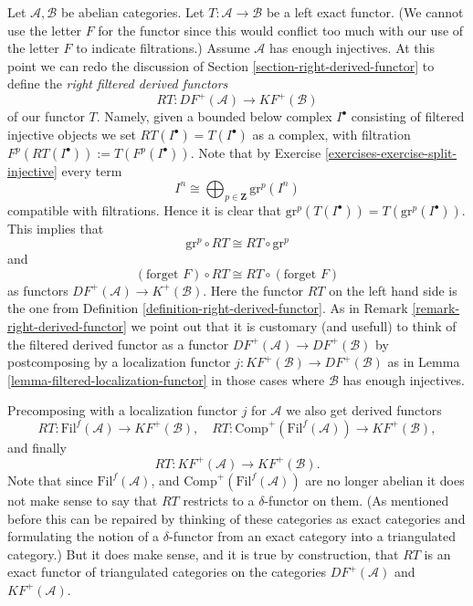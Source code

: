 \noindent
Let $\mathcal{A}, \mathcal{B}$ be abelian categories.
Let $T : \mathcal{A} \to \mathcal{B}$ be a left exact functor.
(We cannot use the letter $F$ for the functor since this would
conflict too much with our use of the letter $F$ to indicate
filtrations.)
Assume $\mathcal{A}$ has enough injectives.
At this point we can redo the discussion of 
Section \ref{section-right-derived-functor} to define the
{\it right filtered derived functors}
\begin{equation}
\label{equation-filtered-derived-functor}
RT : DF^{+}(\mathcal{A}) \longrightarrow KF^{+}(\mathcal{B})
\end{equation}
of our functor $T$. Namely, given a bounded below complex $I^\bullet$
consisting of filtered injective objects we set
$RT(I^\bullet) = T(I^\bullet)$ as a complex, with filtration
$F^p(RT(I^\bullet)) := T(F^p(I^\bullet))$. Note that by
Exercise \ref{exercises-exercise-split-injective} every term
\begin{equation}
\label{equation-decompose}
I^n \cong \bigoplus\nolimits_{p \in \mathbf{Z}} \text{gr}^p(I^n)
\end{equation}
compatible with filtrations. Hence it is clear that
$\text{gr}^p(T(I^\bullet)) = T(\text{gr}^p(I^\bullet))$.
This implies that
\begin{equation}
\label{equation-commute-gr}
\text{gr}^p \circ RT \cong RT \circ \text{gr}^p
\end{equation}
and
\begin{equation}
\label{equation-commute-forget}
(\text{forget }F) \circ RT \cong RT \circ (\text{forget }F)
\end{equation}
as functors $DF^{+}(\mathcal{A}) \to K^{+}(\mathcal{B})$.
Here the functor $RT$ on the left hand side is the one from
Definition \ref{definition-right-derived-functor}.
As in Remark \ref{remark-right-derived-functor} we point out that it
is customary (and usefull) to think of the filtered derived functor
as a functor $DF^{+}(\mathcal{A}) \to DF^{+}(\mathcal{B})$
by postcomposing by a localization functor
$j : KF^{+}(\mathcal{B}) \to DF^{+}(\mathcal{B})$ as in
Lemma \ref{lemma-filtered-localization-functor}
in those cases where $\mathcal{B}$ has enough injectives.

\medskip\noindent
Precomposing with a localization functor $j$ for $\mathcal{A}$
we also get derived functors
$$
RT : \text{Fil}^f(\mathcal{A}) \to KF^{+}(\mathcal{B}),
\quad
RT : \text{Comp}^{+}(\text{Fil}^f(\mathcal{A})) \to KF^{+}(\mathcal{B}),
$$
and finally
$$
RT : KF^{+}(\mathcal{A}) \to KF^{+}(\mathcal{B}).
$$
Note that since $\text{Fil}^f(\mathcal{A})$, and
$\text{Comp}^{+}(\text{Fil}^f(\mathcal{A}))$ are no longer
abelian it does not make sense to say that $RT$ restricts to
a $\delta$-functor on them. (As mentioned before this can be
repaired by thinking of these categories as exact categories and
formulating the notion of a $\delta$-functor from an exact category
into a triangulated category.)
But it does make sense, and it is true
by construction, that $RT$ is an exact functor of triangulated
categories on the categories $DF^{+}(\mathcal{A})$ and
$KF^{+}(\mathcal{A})$.

